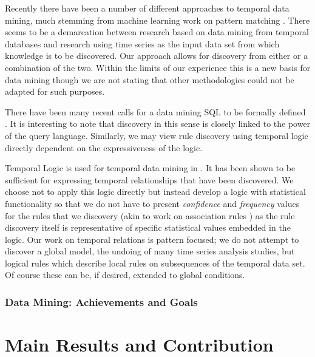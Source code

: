 \medskip

Recently there have been a number of different approaches to temporal
data mining, much stemming from machine learning work on pattern
matching \cite{lai93,alss95}. There seems to be a demarcation between research based on
data mining from temporal databases and research using time series as
the input data set from which knowledge is to be discovered. Our
approach allows for discovery from either or a combination of the
two. Within the limits of our experience this is a new basis for data
mining though we are not stating that other methodologies could not be
adapted for such purposes.

\medskip

There have been many recent calls for a data mining SQL to be formally
defined \cite{im96}. It is interesting to note that discovery in this
sense is closely linked to the power of the query language. Similarly,
we may view rule discovery using temporal logic directly dependent on
the expressiveness of the logic.

\medskip

Temporal Logic is used for temporal data mining in
\cite{pt96,bt98}. It has been shown to be sufficient for expressing
temporal relationships that have been discovered. We choose not to
apply this logic directly but instead develop a logic with statistical
functionality so that we do not have to present {\em confidence} and
{\em frequency} values for the rules that we discovery (akin to work
on association rules \cite{ais93,kmrtv94,hkmt95}) as the rule discovery
itself is representative of specific statistical values embedded in
the logic. Our work on temporal relations is pattern focused; we do
not attempt to discover a global model, the undoing of many time
series analysis studies, but logical rules which describe local rules
on subsequences of the temporal data set. Of course these can be, if
desired, extended to global conditions.


\subsubsection{Data Mining: Achievements and Goals}\label{subsec:goals}

\section{Main Results and Contribution}


